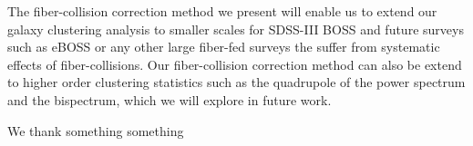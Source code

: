 \documentclass{emulateapj}
\begin{document}
The fiber-collision correction method we present will enable us to extend our galaxy clustering analysis to smaller scales for SDSS-III BOSS and future surveys such as eBOSS or any other large fiber-fed surveys the suffer from systematic effects of fiber-collisions. Our fiber-collision correction method can also be extend to higher order clustering statistics such as the quadrupole of the power spectrum and the bispectrum, which we will explore in future work. 

\bigskip
We thank something something



\end{document}
